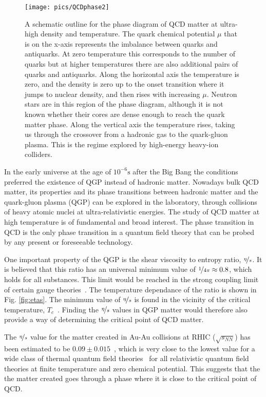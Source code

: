 \begin{figure}[htbp]
\centering
\texttt{[image: pics/QCDphase2]}
\caption[QCD phase diagram]{A schematic outline for the phase diagram of QCD matter at ultra-high density and temperature. The quark chemical potential $\mu$ that is on the x-axis represents the imbalance between quarks and antiquarks. At zero temperature this corresponds to the number of quarks but at higher temperatures there are also additional pairs of quarks and antiquarks. Along the horizontal axis the temperature is zero, and the density is zero up to the onset transition where it jumps to nuclear density, and then rises with increasing $\mu$.  Neutron stars are in this region of the phase diagram, although it is not known whether their cores are dense enough to reach the quark matter phase. Along the vertical axis the temperature rises, taking us through the crossover from a hadronic gas to the quark-gluon plasma. This is the regime explored by high-energy heavy-ion colliders.~\cite{Rajagopal:2001}}
\label{fig:QCDphase}
\end{figure}


In the early universe at the age of $10^{-6}\mathrm{s}$ after the Big Bang the conditions preferred the existence of QGP instead of hadronic matter. Nowadays bulk QCD matter, its properties and its phase transitions between hadronic matter and the quark-gluon plasma (QGP) can be explored in the laboratory, through collisions of heavy atomic nuclei at ultra-relativistic energies. The study of QCD matter at high temperature is of fundamental and broad interest. The phase transition in QCD is the only phase transition in a quantum field theory that can be probed by any present or foreseeable technology. 

One important property of the QGP is the shear viscosity to entropy ratio, $\nicefrac{\eta}{s}$. It is believed that this ratio has an universal minimum value of $\nicefrac{1}{4\pi}\approx 0.8$, which holds for all substances. This limit would be reached in the strong coupling limit of certain gauge theories~\cite{Kovtun:2004de}. The temperature dependance of the ratio is shown in Fig. \ref{fig:etas}. The minimum value of $\nicefrac{\eta}{s}$ is found in the vicinity of the critical temperature, $T_c$~\cite{PhysRevLett.98.092301}. Finding the $\nicefrac{\eta}{s}$ values in QGP matter would therefore also provide a way of determining the critical point of QCD matter.

The $\nicefrac{\eta}{s}$ value for the matter created in Au-Au collisions at RHIC ($\sqrt{s_{NN}}$)  has been estimated to be $0.09\pm0.015$~\cite{PhysRevLett.98.092301}, which is very close to the lowest value for a wide class of thermal quantum field theories~\cite{Kovtun:2004de} for all relativistic quantum field theories at finite temperature and zero chemical potential. This suggests that the the matter created goes through a phase where it is close to the critical point of QCD.

